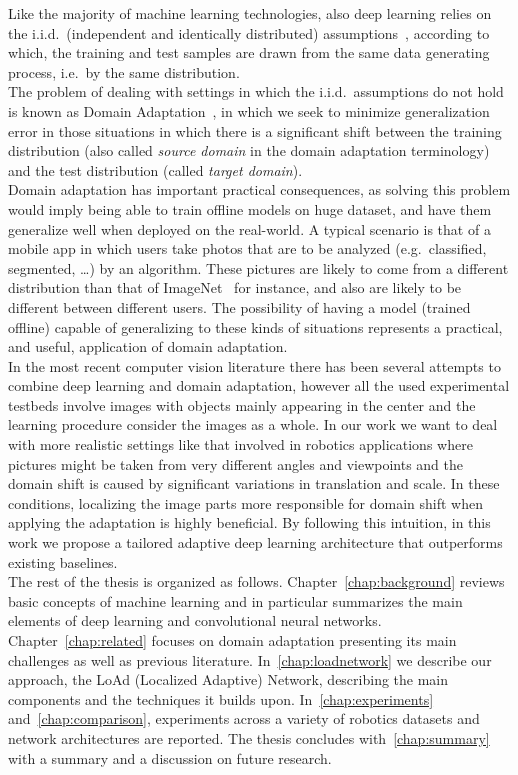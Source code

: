 \documentclass[../main.tex]{subfiles}
\begin{document}
    Like the majority of machine learning technologies, also deep learning relies on the i.i.d.\ (independent and identically distributed) assumptions~\cite{Vapnik1998}, according to which,
    the training and test samples are drawn
    from the same data generating process, i.e.\ by the same distribution. \\
	The problem of dealing with settings in which the i.i.d.\ assumptions
	do not hold is known as Domain Adaptation~\cite{domain-adaptation-review}, in which we seek to minimize generalization error
	in those situations in which there is a significant shift between the training distribution
    (also called \textit{source domain} in the domain adaptation terminology) and the test distribution (called \textit{target domain}). \\
    Domain adaptation has important practical consequences, as solving this problem would imply being able to train offline models
    on huge dataset, and have them generalize well when deployed on the real-world.
    A typical scenario is that of a mobile app in which users take photos that are to be analyzed (e.g.\ classified, segmented, \ldots) by
    an algorithm. These pictures are likely to come from a different distribution than that of ImageNet~\cite{imagenet} for instance,
    and also are likely to be different between different users.
    The possibility of having a model (trained offline) capable of generalizing to these kinds of situations represents a practical, and
    useful, application of domain adaptation. \\
    In the most recent computer vision literature there has been several attempts to combine deep learning and domain adaptation, however all the used experimental testbeds involve images with objects mainly appearing in the center and the learning procedure consider the images as a whole. In our work we want to deal with more realistic settings like that involved in robotics applications where pictures might be taken from very different angles and viewpoints and the domain shift is caused by significant variations in translation and scale. In these conditions, localizing the image parts more responsible for domain shift when applying the adaptation is highly beneficial. By following this intuition, in this work we propose a tailored adaptive deep learning architecture that outperforms existing baselines. \\
    The rest of the thesis is organized as follows. Chapter~\ref{chap:background} reviews basic concepts of machine learning and in particular summarizes the main elements of deep learning and convolutional neural networks. Chapter~\ref{chap:related} focuses on domain adaptation presenting its main challenges as well as previous literature.
    In~\autoref{chap:loadnetwork} we describe our approach, the LoAd (Localized Adaptive) Network, describing
    the main components and the techniques it builds upon. In~\autoref{chap:experiments} and~\autoref{chap:comparison},
    experiments across a variety of robotics datasets and network architectures are reported.
    The thesis concludes with~\autoref{chap:summary} with a summary and a discussion on future research.
\end{document}
